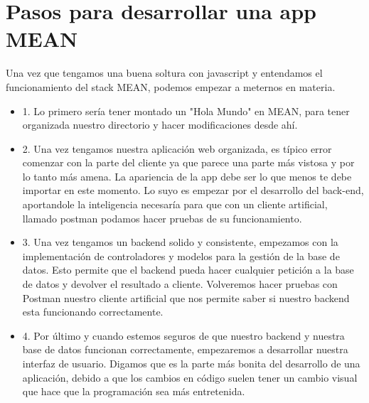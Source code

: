 \section{Pasos para desarrollar una app MEAN}

Una vez que tengamos una buena soltura con javascript y entendamos el funcionamiento del stack MEAN, podemos empezar a meternos en materia.

\begin{itemize}

\item1. Lo primero sería tener montado un "Hola Mundo" en MEAN, para tener organizada nuestro directorio y hacer modificaciones desde ahí.

\item2. Una vez tengamos nuestra aplicación web organizada, es típico error comenzar con la parte del cliente ya que parece una parte más vistosa y por lo tanto más amena. La apariencia de la app debe ser lo que menos te debe importar en este momento. Lo suyo es empezar por el desarrollo del back-end, aportandole la inteligencia necesaría para que con un cliente artificial, llamado postman podamos hacer pruebas de su funcionamiento.

\item3. Una vez tengamos un backend solido y consistente, empezamos con la implementación de controladores y modelos para la gestión de la base de datos. Esto permite que el backend pueda hacer cualquier petición a la base de datos y devolver el resultado a cliente. Volveremos hacer pruebas con Postman nuestro cliente artificial que nos permite saber si nuestro backend esta funcionando correctamente.

\item4. Por último y cuando estemos seguros de que nuestro backend y nuestra base de datos funcionan correctamente, empezaremos a desarrollar nuestra interfaz de usuario. Digamos que es la parte más bonita del desarrollo de una aplicación, debido a que los cambios en código suelen tener un cambio visual que hace que la programación sea más entretenida. 

\end{itemize}